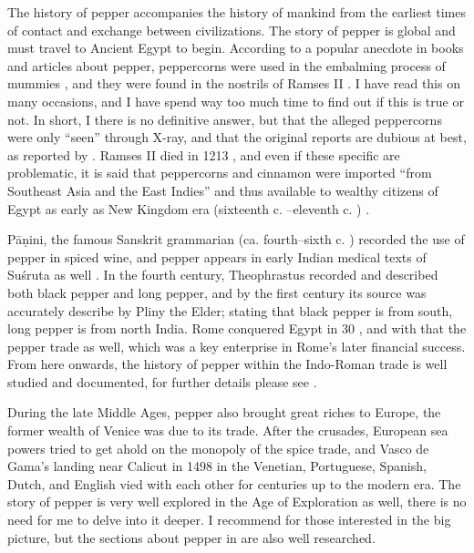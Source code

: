 The history of pepper accompanies the history of mankind from the earliest times of contact and exchange between civilizations. The story of pepper is global and must travel to Ancient Egypt to begin. According to a popular anecdote in books and articles about pepper, peppercorns were used in the embalming process of mummies \autocite{ravindran_black_2000}, and they were found in the nostrils of Ramses II \autocite[168]{turner_spice_2004}. I have read this on many occasions, and I have spend way too much time to find out if this is true or not. In short, I there is no definitive answer, but that the alleged peppercorns were only ``seen'' through X-ray, and that the original reports are dubious at best, as reported by \textcite[206]{bucaille_mummies_1990}. Ramses II died in 1213 \BC{}, and even if these specific are problematic, it is said that peppercorns and cinnamon were imported ``from Southeast Asia and the East Indies'' and thus available to wealthy citizens of Egypt as early as New Kingdom era (sixteenth c. \BC{}--eleventh c. \BC{}) \autocite[394]{salima_diet_2005}.

Pāṇini, the famous Sanskrit grammarian (ca. fourth--sixth c. \BC{}) recorded the use of pepper in spiced wine, and pepper appears in early Indian medical texts of Suśruta as well \autocite{ravindran_black_2000}. In the fourth century, Theophrastus recorded and described both black pepper and long pepper, and by the first century \AD{} its source was accurately describe by Pliny the Elder; stating that black pepper is from south, long pepper is from north India. Rome conquered Egypt in 30 \BC{}, and with that the pepper trade as well, which was a key enterprise in Rome's later financial success. From here onwards, the history of pepper within the Indo-Roman trade is well studied and documented, for further details please see \textcite{sidebotham_berenike_2011,de_romanis_indo-roman_2020,miller_spice_1969}. 


During the late Middle Ages, pepper also brought great riches to Europe, the former wealth of Venice was due to its trade. After the crusades, European sea powers tried to get ahold on the monopoly of the spice trade, and Vasco de Gama's landing near Calicut in 1498 in the Venetian, Portuguese, Spanish, Dutch, and English vied with each other for centuries up to the modern era. The story of pepper is very well explored in the Age of Exploration as well, there is no need for me to delve into it deeper. I recommend \textcite{shaffer_pepper_2013} for those interested in the big picture, but the sections about pepper in \textcite{dalby_dangerous_2000,turner_spice_2004} are also well researched.

